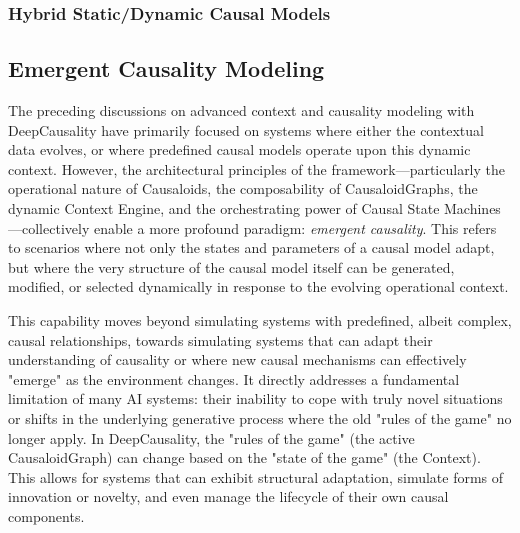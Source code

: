 \subsubsection{Hybrid Static/Dynamic Causal Models}
\label{subsubsec:adv_hybrid_static_dynamic_causal_model}

\newpage

\subsection{Emergent Causality Modeling}
\label{subsec:emergent_causality}


The preceding discussions on advanced context and causality modeling with DeepCausality have primarily focused on systems where either the contextual data evolves, or where predefined causal models operate upon this dynamic context. However, the architectural principles of the framework—particularly the operational nature of Causaloids, the composability of CausaloidGraphs, the dynamic Context Engine, and the orchestrating power of Causal State Machines—collectively enable a more profound paradigm: \textit{emergent causality}. This refers to scenarios where not only the states and parameters of a causal model adapt, but where the very structure of the causal model itself can be generated, modified, or selected dynamically in response to the evolving operational context.

This capability moves beyond simulating systems with predefined, albeit complex, causal relationships, towards simulating systems that can adapt their understanding of causality or where new causal mechanisms can effectively "emerge" as the environment changes. It directly addresses a fundamental limitation of many AI systems: their inability to cope with truly novel situations or shifts in the underlying generative process where the old "rules of the game" no
longer apply. In DeepCausality, the "rules of the game" (the active CausaloidGraph) can change based on the "state of the game" (the Context). This allows for systems that can exhibit structural adaptation, simulate forms of innovation or novelty, and even manage the lifecycle of their own causal components.

